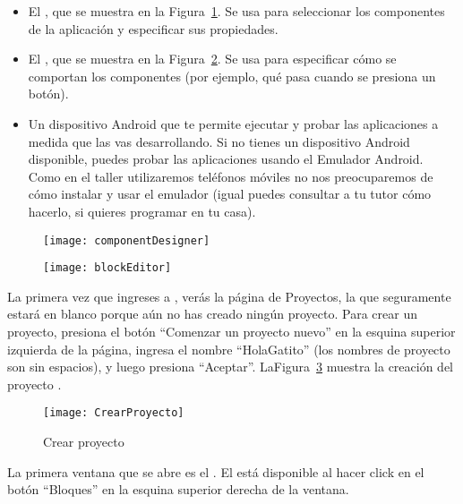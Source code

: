 \begin{itemize}

\item El \componentDesigner, que se muestra en la
  Figura~\ref{fig:componentDesigner}. Se usa para seleccionar los
  componentes de la aplicación y especificar sus propiedades.

\item El \blockEditor, que se muestra en la
  Figura~\ref{fig:blockEditor}. Se usa para especificar cómo se
  comportan los componentes (por ejemplo, qué pasa cuando se presiona
  un botón).

\item Un dispositivo Android que te permite ejecutar y probar las
  aplicaciones a medida que las vas desarrollando. Si no tienes un
  dispositivo Android disponible, puedes probar las aplicaciones
  usando el Emulador Android. Como en el taller utilizaremos teléfonos
  móviles no nos preocuparemos de cómo instalar y usar el emulador
  (igual puedes consultar a tu tutor cómo hacerlo, si quieres
  programar en tu casa).

\end{itemize}

\begin{figure}[H]
  \centering
  \texttt{[image: componentDesigner]}
  \caption{\componentDesigner}
  \label{fig:componentDesigner}
\end{figure}

\begin{figure}[H]
  \centering
  \texttt{[image: blockEditor]}
  \caption{\blockEditor}
  \label{fig:blockEditor}
\end{figure}

La primera vez que ingreses a \aiurl, verás la página de Proyectos, la
que seguramente estará en blanco porque aún no has creado ningún
proyecto. Para crear un proyecto, presiona el botón ``Comenzar un
proyecto nuevo'' en la esquina superior izquierda de la página,
ingresa el nombre ``HolaGatito'' (los nombres de proyecto son sin
espacios), y luego presiona
``Aceptar''. LaFigura~\ref{fig:crearProyecto} muestra la creación del
proyecto .


\begin{figure}[H]
  \centering
  \texttt{[image: CrearProyecto]}
  \caption{Crear proyecto }
  \label{fig:crearProyecto}
\end{figure}

La primera ventana que se abre es el \componentDesigner. El
\blockEditor está disponible al hacer click en el botón ``Bloques'' en
la esquina superior derecha de la ventana.

